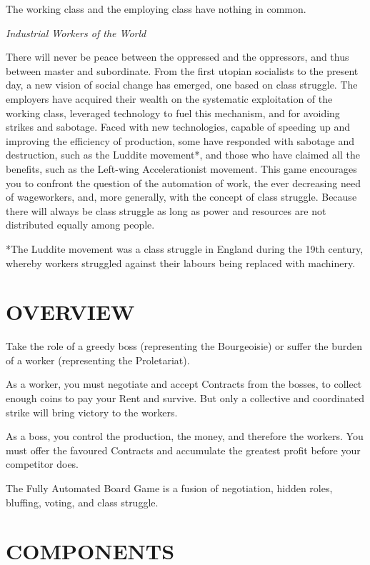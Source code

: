     \epigraph{The working class and the employing class have nothing in common.}{\textit{Industrial Workers of the World}}
    
    There will never be peace between the oppressed and the oppressors, and thus between
    master and subordinate. From the first utopian socialists to the present day, a new vision
    of social change has emerged, one based on class struggle. The employers have acquired
    their wealth on the systematic exploitation of the working class, leveraged technology to
    fuel this mechanism, and for avoiding strikes and sabotage. Faced with new technologies,
    capable of speeding up and improving the efficiency of production, some have responded with
    sabotage and destruction, such as the Luddite movement*, and those who
    have claimed all the benefits, such as the Left-wing Accelerationist movement. This game
    encourages you to confront the question of the automation of work, the ever decreasing
    need of wageworkers, and, more generally, with the concept of class struggle. Because
    there will always be class struggle as long as power and resources are not distributed
    equally among people.
    
    *The Luddite movement was a class struggle in England during the 19th century, whereby
    workers struggled against their labours being replaced with machinery.


\section{OVERVIEW}

    Take the role of a greedy boss (representing the Bourgeoisie) or suffer the burden of a
    worker (representing the Proletariat).
    
    As a worker, you must negotiate and accept Contracts from the bosses, to collect enough
    coins to pay your Rent and survive. But only a collective and coordinated strike will bring
    victory to the workers.
    
    As a boss, you control the production, the money, and therefore the workers. You must
    offer the favoured Contracts and accumulate the greatest profit before your competitor
    does.
    
    The Fully Automated Board Game is a fusion of negotiation, hidden roles, bluffing, voting,
    and class struggle.


\section{COMPONENTS}

